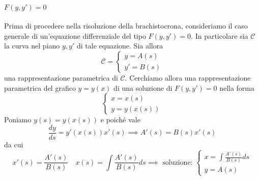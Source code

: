 \paragraph{\(F{(y, y')} = 0\)} Prima di procedere nella risoluzione della
brachistocrona, consideriamo il caso generale di un'equazione differenziale del
tipo \(F{(y, y')} = 0\). In particolare sia \(\mathcal{C}\) la curva nel piano
\(y, y'\) di tale equazione. Sia allora
\[
  \mathcal{C} = \begin{cases}
      y = A{(s)} \\
      y' = B{(s)}
  \end{cases}
\]
una rappresentazione parametrica di \(\mathcal{C}\). Cerchiamo allora una
rappresentazione parametrica del grafico \(y = y{(x)}\) di una soluzione di
\(F{(y, y')} =0\) nella forma 
\[
  \begin{cases}
      x = x{(s)} \\
      y = y{(x{(s)})}
  \end{cases}
\]
Poniamo \(y{(s)} = y{(x{(s)})}\) e poiché vale
\[
    \frac{dy}{ds} = y'{(x{(s)})} x'{(s)} \implies A'{(s)} = B{(s)} x'{(s)}
\]
da cui
\begin{equation}\label{eq:diff_Fyyp}
    x'{(s)} = \frac{A'{(s)}}{B{(s)}} \quad x{(s)} = \int \frac{A'(s)}{B(s)} ds
    \implies \text{ soluzione: } \begin{cases}
        x = \int \frac{A'(s)}{B(s)} ds \\
        y = A{(s)}
    \end{cases}
\end{equation}
